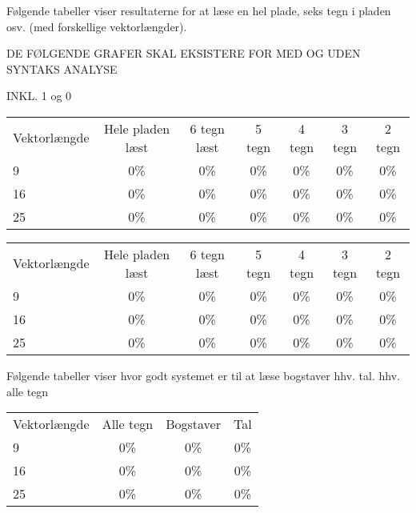 Følgende tabeller viser resultaterne for at læse en hel plade, seks tegn i pladen osv. (med forskellige vektorlængder).

DE FØLGENDE GRAFER SKAL EKSISTERE FOR MED OG UDEN SYNTAKS ANALYSE

INKL. 1 og 0

\begin{tabular}{|l|c|c|c|c|c|c|}\hline
\rowcolor[gray]{0.9} \multicolumn{7}{|>{\columncolor[gray]{0.9}}c|}{\textbf{Træningssæt}} \\ \hline
Vektorlængde & Hele pladen læst & 6 tegn læst & 5 tegn & 4 tegn & 3 tegn & 2 tegn \\\hline
9 & 0\% & 0\% & 0\% & 0\% & 0\% & 0\% \\\hline
16 & 0\% & 0\% & 0\% & 0\% & 0\% & 0\% \\\hline
25 & 0\% & 0\% & 0\% & 0\% & 0\% & 0\% \\\hline \end{tabular}

\begin{tabular}{|l|c|c|c|c|c|c|}\hline
\rowcolor[gray]{0.9} \multicolumn{7}{|>{\columncolor[gray]{0.9}}c|}{\textbf{Kontrolsæt}} \\ \hline
Vektorlængde & Hele pladen læst & 6 tegn læst & 5 tegn & 4 tegn & 3 tegn & 2 tegn \\\hline
9 & 0\% & 0\% & 0\% & 0\% & 0\% & 0\% \\\hline
16 & 0\% & 0\% & 0\% & 0\% & 0\% & 0\% \\\hline
25 & 0\% & 0\% & 0\% & 0\% & 0\% & 0\% \\\hline \end{tabular}


Følgende tabeller viser hvor godt systemet er til at læse bogstaver hhv. tal. hhv. alle tegn

\begin{tabular}{|l|c|c|c|}\hline
\rowcolor[gray]{0.9} \multicolumn{4}{|>{\columncolor[gray]{0.9}}c|}{\textbf{Træningssæt}} \\ \hline
Vektorlængde & Alle tegn & Bogstaver & Tal \\\hline
9 & 0\% & 0\% & 0\% \\\hline
16 & 0\% & 0\% & 0\%\\\hline
25 & 0\% & 0\% & 0\%\\\hline \end{tabular}

